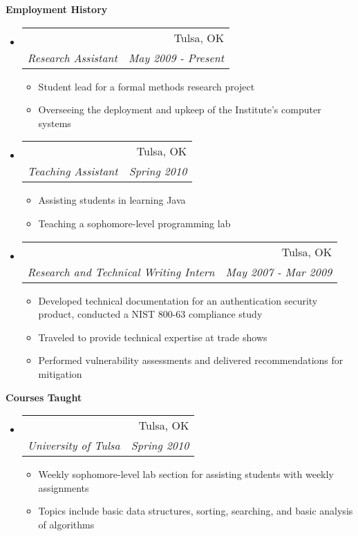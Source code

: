 \documentclass[letterpaper,11pt]{article}
\makeatletter
\newcommand{\resitem}[1]{\item #1 \vspace{-2pt}}
\newcommand{\resheading}[1]{{\large \colorbox{mygrey}{\begin{minipage}{\textwidth}{\textbf{#1 \vphantom{p\^{E}}}}\end{minipage}}}}
\newcommand{\ressubheading}[4]{
\begin{tabular*}{6.5in}{l@{\extracolsep{\fill}}r}
		\textbf{\parbox{5in}{\raggedright #1 }} & #2 \\
		\textit{#3} & \textit{#4} \\
\end{tabular*}\vspace{-6pt}}
\makeatother
\begin{document}
\resheading{Employment History}
\begin{itemize}
\item
	\ressubheading{Institute for Information Security, TU}{Tulsa, OK}{Research Assistant}{May 2009 - Present}
	\begin{itemize}
		\resitem{Student lead for a formal methods research project}
		\resitem{Overseeing the deployment and upkeep of the Institute's computer systems}
	\end{itemize}

\item
	\ressubheading{University of Tulsa}{Tulsa, OK}{Teaching Assistant}{Spring 2010}
	\begin{itemize}
		\resitem{Assisting students in learning Java}
		\resitem{Teaching a sophomore-level programming lab}
	\end{itemize}
\item
	\ressubheading{Vidoop}{Tulsa, OK}{Research and Technical Writing Intern}{May 2007 - Mar 2009}
	\begin{itemize}
		\resitem{Developed technical documentation for an authentication security product, conducted a NIST 800-63 compliance study}
		\resitem{Traveled to provide technical expertise at trade shows}
		\resitem{Performed vulnerability assessments and delivered recommendations for mitigation}
	\end{itemize}
\end{itemize}

\resheading{Courses Taught}
\begin{itemize}
\item
	\ressubheading{Fundamentals of Algorithm and Computer Applications Lab}{Tulsa, OK}{University of Tulsa}{Spring 2010}
	\begin{itemize}
		\resitem{Weekly sophomore-level lab section for assisting students with weekly assignments}
		\resitem{Topics include basic data structures, sorting, searching, and basic analysis of algorithms}
	\end{itemize}
\end{itemize}
\end{document}
